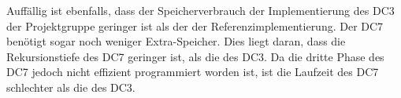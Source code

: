 Auffällig ist ebenfalls, dass der Speicherverbrauch der Implementierung des DC3 der Projektgruppe geringer ist als der der Referenzimplementierung. Der DC7 benötigt sogar noch weniger Extra-Speicher. Dies liegt daran, dass die Rekursionstiefe des DC7 geringer ist, als die des DC3. Da die dritte Phase des DC7 jedoch nicht effizient programmiert worden ist, ist die Laufzeit des DC7 schlechter als die des DC3.